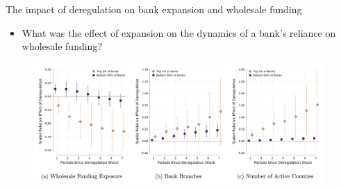 \documentclass[notes,10pt, aspectratio=169]{beamer}
\begin{document}
\begin{frame}{The impact of deregulation on bank expansion and wholesale funding}\label{der_impac2}
    \begin{itemize}
        \item What was the effect of expansion on the dynamics of a bank’s reliance on wholesale funding? %
         \end{itemize}



    \begin{figure}
        \centering
        \includegraphics[width=0.99\textwidth]{imgs/fig12.png}
        \label{fig:my_label}
    \end{figure}
    
    \end{frame}
\end{document}
